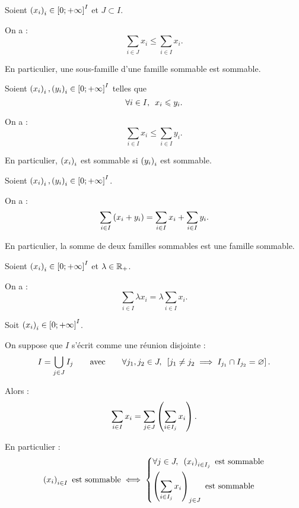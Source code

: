 \begin{prop}
Soient \(\left(x_i\right)_i\in\left[0;+\infty\right]^I\) et \(J\subset I\).

On a : \[\sum_{i\in J}x_i\leq\sum_{i\in I}x_i.\]

En particulier, une sous-famille d'une famille sommable est sommable.
\end{prop}

\begin{prop}
Soient \(\left(x_i\right)_i,\left(y_i\right)_i\in\left[0;+\infty\right]^I\) telles que \[\quantifs{\forall i\in I}x_i\leq y_i.\]

On a : \[\sum_{i\in I}x_i\leq\sum_{i\in I}y_i.\]

En particulier, \(\left(x_i\right)_i\) est sommable si \(\left(y_i\right)_i\) est sommable.
\end{prop}

\begin{prop}
Soient \(\left(x_i\right)_i,\left(y_i\right)_i\in\left[0;+\infty\right]^I\).

On a : \[\sum_{i\in I}\left(x_i+y_i\right)=\sum_{i\in I}x_i+\sum_{i\in I}y_i.\]

En particulier, la somme de deux familles sommables est une famille sommable.
\end{prop}

\begin{prop}
Soient \(\left(x_i\right)_i\in\left[0;+\infty\right]^I\) et \(\lambda\in\mathbb{R}_+\).

On a : \[\sum_{i\in I}\lambda x_i=\lambda\sum_{i\in I}x_i.\]
\end{prop}

\begin{theo}
Soit \(\left(x_i\right)_i\in\left[0;+\infty\right]^I\).

On suppose que \(I\) s'écrit comme une réunion disjointe : \[I=\bigunion_{j\in J}I_j\qquad\text{avec}\qquad\quantifs{\forall j_1,j_2\in J}\croch{j_1\not=j_2\imp I_{j_1}\inter I_{j_2}=\ensvide}.\]

Alors : \[\sum_{i\in I}x_i=\sum_{j\in J}\left(\sum_{i\in I_j}x_i\right).\]

En particulier : \[\paren{x_i}_{i\in I}\text{ est sommable}\ssi\begin{dcases}
\quantifs{\forall j\in J}\paren{x_i}_{i\in I_j}\text{ est sommable} \\
\paren{\sum_{i\in I_j}x_i}_{j\in J}\text{ est sommable}
\end{dcases}\]
\end{theo}

